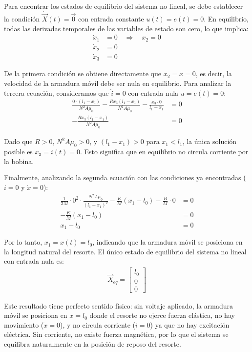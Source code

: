 \documentclass[
  11pt,
  letterpaper,
   addpoints,
   answers
  ]{exam}
\begin{document}
\begin{solution}
Para encontrar los estados de equilibrio del sistema no lineal, se debe establecer la condición $\dot{\vec{X}}(t) = \vec{0}$ con entrada constante $u(t) = e(t) = 0$. En equilibrio, todas las derivadas temporales de las variables de estado son cero, lo que implica:
\begin{align}
\dot{x}_1 &= 0 \quad \Rightarrow \quad x_2 = 0 \\
\dot{x}_2 &= 0 \\
\dot{x}_3 &= 0
\end{align}

De la primera condición se obtiene directamente que $x_2 = \dot{x} = 0$, es decir, la velocidad de la armadura móvil debe ser nula en equilibrio. Para analizar la tercera ecuación, consideramos que $\dot{i} = 0$ con entrada nula $u = e(t) = 0$:
\begin{align}
\frac{0 \cdot (l_1 - x_1)}{N^2 A \mu_0} - \frac{R x_3 (l_1 - x_1)}{N^2 A \mu_0} - \frac{x_3 \cdot 0}{l_1 - x_1} &= 0\\
-\frac{R x_3 (l_1 - x_1)}{N^2 A \mu_0} &= 0
\end{align}

Dado que $R > 0$, $N^2 A \mu_0 > 0$, y $(l_1 - x_1) > 0$ para $x_1 < l_1$, la única solución posible es $x_3 = i(t) = 0$. Esto significa que en equilibrio no circula corriente por la bobina.

Finalmente, analizando la segunda ecuación con las condiciones ya encontradas ($i = 0$ y $\dot{x} = 0$):
\begin{align}
\frac{1}{2M} \cdot 0^2 \cdot \frac{N^2 A \mu_0}{(l_1 - x_1)^2} - \frac{K}{M}(x_1 - l_0) - \frac{B}{M} \cdot 0 &= 0\\
-\frac{K}{M}(x_1 - l_0) &= 0\\
x_1 - l_0 &= 0
\end{align}

Por lo tanto, $x_1 = x(t) = l_0$, indicando que la armadura móvil se posiciona en la longitud natural del resorte. El único estado de equilibrio del sistema no lineal con entrada nula es:
\begin{align}
\boxed{\vec{X}_{eq} = \begin{bmatrix}
l_0 \\
0 \\
0
\end{bmatrix}}
\end{align}

Este resultado tiene perfecto sentido físico: sin voltaje aplicado, la armadura móvil se posiciona en $x = l_0$ donde el resorte no ejerce fuerza elástica, no hay movimiento ($\dot{x} = 0$), y no circula corriente ($i = 0$) ya que no hay excitación eléctrica. Sin corriente, no existe fuerza magnética, por lo que el sistema se equilibra naturalmente en la posición de reposo del resorte.


\end{solution}
\end{document}
